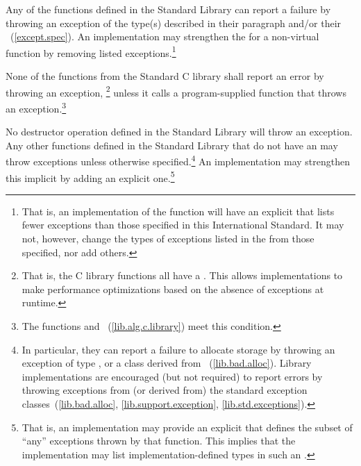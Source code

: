 \pnum
Any of the functions defined in the \Cpp Standard Library
%
can report a failure by throwing an exception of the type(s) described in their
paragraph and/or their
~(\ref{except.spec}).
An implementation may strengthen the
for a non-virtual function by removing listed exceptions.\footnote{That is,
an implementation of the function will have an explicit
that lists fewer exceptions than those specified in this International
Standard. It may not, however, change the types of exceptions listed in the
from those specified, nor add others.}

\pnum
None of the functions from the Standard C library shall report an error by
throwing an exception,%
\footnote{That is, the C
library functions all have a  .
This allows implementations to make performance optimizations
based on the absence of exceptions at runtime.}
unless it calls a program-supplied function that throws an
exception.\footnote{The functions
and
~(\ref{lib.alg.c.library}) meet this condition.}

\pnum
No destructor operation defined in the \Cpp Standard Library
will throw an exception.
Any other functions defined in the
\Cpp Standard Library
%
that do not have an
may throw  exceptions
unless otherwise specified.\footnote{In particular, they
can report a failure to allocate storage by throwing an exception of type
,
or a class derived from
~(\ref{lib.bad.alloc}).
Library implementations are encouraged (but not required) to
report errors by throwing exceptions from (or derived
from) the standard exception classes~(\ref{lib.bad.alloc},
\ref{lib.support.exception}, \ref{lib.std.exceptions}).}
An implementation may strengthen this implicit
by adding an explicit one.\footnote{That is, an implementation may provide an explicit
that defines the subset of ``any'' exceptions thrown by that function.
This implies that the implementation may list implementation-defined types
in such an
%
%
.}
